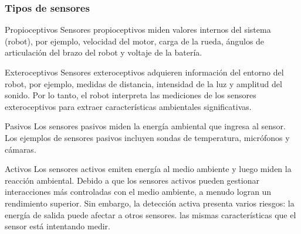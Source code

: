 \begin{frame}
    \frametitle{Tipos de sensores}
    \footnotesize
    
    \begin{block}{Propioceptivos}
        Sensores propioceptivos miden valores internos del sistema (robot), por ejemplo, velocidad del motor, carga de la rueda, ángulos de articulación del brazo del robot y voltaje de la batería.
    \end{block}

    \begin{block}{Exteroceptivos}
        Sensores exteroceptivos adquieren información del entorno del robot, por ejemplo, medidas de distancia, intensidad de la luz y amplitud del sonido. Por lo tanto, el robot interpreta las mediciones de los sensores exteroceptivos para extraer características ambientales significativas.
    \end{block}

    \begin{block}{Pasivos}
        Los sensores pasivos miden la energía ambiental que ingresa al sensor. Los ejemplos de sensores pasivos incluyen sondas de temperatura, micrófonos y cámaras.
    \end{block}


    \begin{block}{Activos}
        Los sensores activos emiten energía al medio ambiente y luego miden la reacción ambiental. Debido a que los sensores activos pueden gestionar interacciones más controladas con el medio ambiente, a menudo logran un rendimiento superior. Sin embargo, la detección activa presenta varios riesgos: la energía de salida puede afectar a otros sensores. las mismas características que el sensor está intentando medir.
        
    \end{block}


\end{frame}



